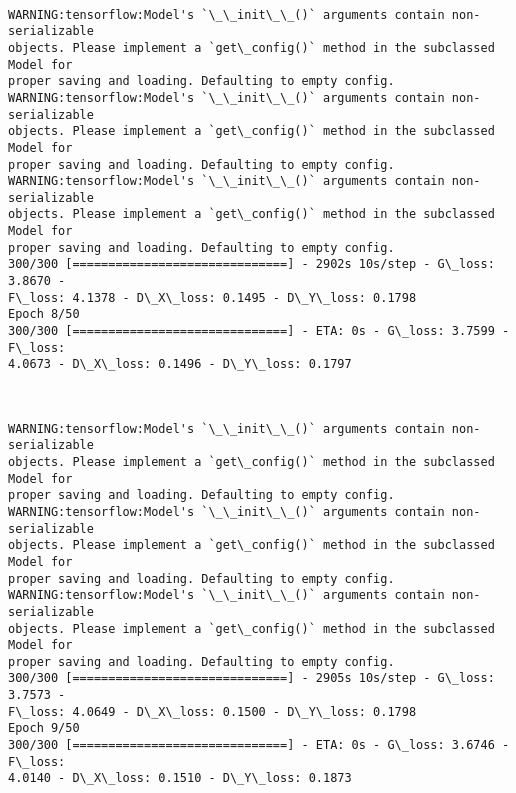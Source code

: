 \documentclass[11pt]{article}
\begin{document}
    \begin{center}
    \end{center}
    { \hspace*{\fill} \\}
    
    \begin{Verbatim}[commandchars=\\\{\}]
WARNING:tensorflow:Model's `\_\_init\_\_()` arguments contain non-serializable
objects. Please implement a `get\_config()` method in the subclassed Model for
proper saving and loading. Defaulting to empty config.
WARNING:tensorflow:Model's `\_\_init\_\_()` arguments contain non-serializable
objects. Please implement a `get\_config()` method in the subclassed Model for
proper saving and loading. Defaulting to empty config.
WARNING:tensorflow:Model's `\_\_init\_\_()` arguments contain non-serializable
objects. Please implement a `get\_config()` method in the subclassed Model for
proper saving and loading. Defaulting to empty config.
300/300 [==============================] - 2902s 10s/step - G\_loss: 3.8670 -
F\_loss: 4.1378 - D\_X\_loss: 0.1495 - D\_Y\_loss: 0.1798
Epoch 8/50
300/300 [==============================] - ETA: 0s - G\_loss: 3.7599 - F\_loss:
4.0673 - D\_X\_loss: 0.1496 - D\_Y\_loss: 0.1797
    \end{Verbatim}

    \begin{center}
    \end{center}
    { \hspace*{\fill} \\}
    
    \begin{Verbatim}[commandchars=\\\{\}]
WARNING:tensorflow:Model's `\_\_init\_\_()` arguments contain non-serializable
objects. Please implement a `get\_config()` method in the subclassed Model for
proper saving and loading. Defaulting to empty config.
WARNING:tensorflow:Model's `\_\_init\_\_()` arguments contain non-serializable
objects. Please implement a `get\_config()` method in the subclassed Model for
proper saving and loading. Defaulting to empty config.
WARNING:tensorflow:Model's `\_\_init\_\_()` arguments contain non-serializable
objects. Please implement a `get\_config()` method in the subclassed Model for
proper saving and loading. Defaulting to empty config.
300/300 [==============================] - 2905s 10s/step - G\_loss: 3.7573 -
F\_loss: 4.0649 - D\_X\_loss: 0.1500 - D\_Y\_loss: 0.1798
Epoch 9/50
300/300 [==============================] - ETA: 0s - G\_loss: 3.6746 - F\_loss:
4.0140 - D\_X\_loss: 0.1510 - D\_Y\_loss: 0.1873
    \end{Verbatim}
\end{document}
